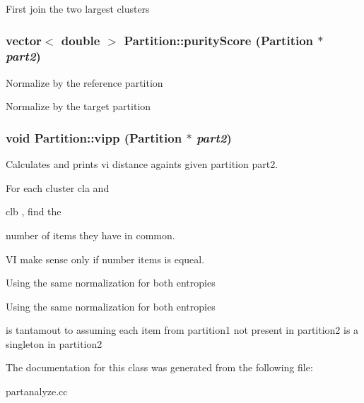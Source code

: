 First join the two largest clusters 
\subsubsection{\setlength{\rightskip}{0pt plus 5cm}vector$<$ double $>$ Partition::purity\-Score ({\bf Partition} $\ast$ {\em part2})}\label{classPartition_a41}


Normalize by the reference partition

Normalize by the target partition 
\subsubsection{\setlength{\rightskip}{0pt plus 5cm}void Partition::vipp ({\bf Partition} $\ast$ {\em part2})}\label{classPartition_a19}


Calculates and prints vi distance againts given partition part2. 

For each cluster cla and

clb , find the 

number of items they have in common.

VI make sense only if number items is equeal.

Using the same normalization for both entropies

Using the same normalization for both entropies

is tantamout to assuming each item from partition1 not present in partition2 is a singleton in partition2 

The documentation for this class was generated from the following file:\begin{CompactItemize}
\item 
partanalyze.cc\end{CompactItemize}

